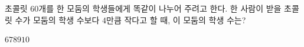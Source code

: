 초콜릿 $60$개를 한 모둠의 학생들에게 똑같이 나누어 주려고 한다. 한 사람이 받을 초콜릿 수가 모둠의 학생 수보다 $4$만큼 작다고 할 때, 이 모둠의 학생 수는?
\begin{choices32}{$6$}{$7$}{$8$}{$9$}{$10$}\end{choices32}
